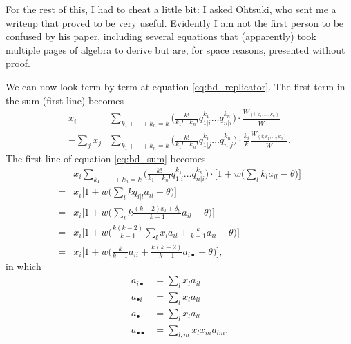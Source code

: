 \documentclass[14pt, justified]{tufte-handout}
\begin{document}
For the rest of this, I had to cheat a little bit: I asked Ohtsuki, who sent me a writeup that proved to be very useful.
Evidently I am not the first person to be confused by his paper, including several equations that (apparently) took multiple pages of algebra to derive but are, for space reasons, presented without proof.

We can now look term by term at equation \ref{eq:bd_replicator}.
The first term in the sum (first line) becomes
\begin{equation}
    \begin{split}
        x_i & \sum_{k_1 + \cdots + k_n = k} \Big( \frac{k!}{k_1! \ldots k_n!} q_{1|i}^{k_1} \ldots q_{n|i}^{k_n} \Big) \cdot \frac{W_{(i; k_1, \ldots ,k_n)}}{\bar{W}}
        \\
        - \sum_j x_j & \sum_{k_1 + \cdots + k_n = k} \Big( \frac{k!}{k_1! \ldots k_n!} q_{1|j}^{k_1} \ldots q_{n|j}^{k_n} \Big) \cdot \frac{k_i}{k} \frac{W_{(i; k_1, \ldots ,k_n)}}{\bar{W}}.
    \end{split}
    \label{eq:bd_sum}
\end{equation}
The first line of equation \ref{eq:bd_sum} becomes
\begin{equation}
    \begin{split}
        & x_i \sum_{k_1 + \cdots + k_n = k} \Big( \frac{k!}{k_1! \ldots k_n!} q_{1|i}^{k_1} \ldots q_{n|i}^{k_n} \Big) \cdot \Big[ 1 + w \Big( \sum_l k_l a_{il} - \theta \Big) \Big]
        \\
        = & x_i \Big[ 1 + w \Big( \sum_l kq_{i|l} a_{il} - \theta \Big) \Big]
        \\
        = & x_i \Big[ 1 + w \Big( \sum_l k \frac{(k-2)x_l + \delta_{li}}{k-1} a_{il} - \theta \Big) \Big]
        \\
        = & x_i \Big[ 1 + w \Big( \frac{k(k-2)}{k-1} \sum_l x_l a_{il} + \frac{k}{k-1} a_{ii} - \theta \Big) \Big]
        \\
        = & x_i \Big[ 1 + w \Big( \frac{k}{k-1} a_{ii} + \frac{k(k-2)}{k-1} a_{i \bullet } - \theta \Big) \Big],
    \end{split}
    \label{eq:bd_sum_1}
\end{equation}
in which
\begin{equation}
    \begin{split}
        a_{i \bullet} & = \sum_l x_l a_{il}
        \\
        a_{\bullet i} & = \sum_l x_l a_{li}
        \\
        a_{\bullet} & = \sum_l x_l a_{ll}
        \\
        a_{\bullet \bullet} & = \sum_{l,m} x_l x_m a_{lm}.
    \end{split}
\end{equation}
\end{document}

